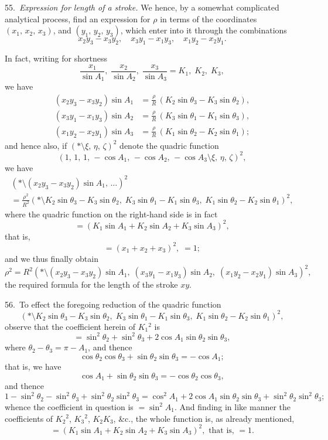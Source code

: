 \documentclass[12pt,a4paper]{article}
\theoremstyle{definition}
\begin{document}
55.\ \textit{Expression for length of a stroke.} We hence, by a somewhat complicated
analytical process, find an expression for $\rho$ in terms of the coordinates
$(x_1,\, x_2,\, x_3)$, and $(y_1,\, y_2,\, y_3)$, which enter into it through the combinations
\[
x_2 y_3 - x_3 y_2, \quad x_3 y_1 - x_1 y_3, \quad x_1 y_2 - x_2 y_1.
\]

In fact, writing for shortness
\[
\frac{x_1}{\sin A_1},\; \frac{x_2}{\sin A_2},\; \frac{x_3}{\sin A_3} = K_1,\; K_2,\; K_3,
\]
we have
\begin{align*}
(x_2 y_3 - x_3 y_2) \sin A_1 &= \frac{\rho}{R}\, (K_2 \sin \theta_3 - K_3 \sin \theta_2),\\
(x_3 y_1 - x_1 y_3) \sin A_2 &= \frac{\rho}{R}\, (K_3 \sin \theta_1 - K_1 \sin \theta_3),\\
(x_1 y_2 - x_2 y_1) \sin A_3 &= \frac{\rho}{R}\, (K_1 \sin \theta_2 - K_2 \sin \theta_1);
\end{align*}
and hence also, if $(*\!\mathbin{\!\!\setminus\!\!}\xi,\, \eta,\, \zeta)^2$ denote the quadric function
\[
(1,\, 1,\, 1,\, -\cos A_1,\, -\cos A_2,\, -\cos A_3 \!\mathbin{\!\!\setminus\!\!}\xi,\, \eta,\, \zeta)^2,
\]
we have
\begin{multline*}
(*\!\mathbin{\!\!\setminus\!\!}(x_2 y_3 - x_3 y_2) \sin A_1,\, \ldots)^2\\
= \frac{\rho^2}{R^2}
(*\!\mathbin{\!\!\setminus\!\!}K_2 \sin \theta_3 - K_3 \sin \theta_2,\;
K_3 \sin \theta_1 - K_1 \sin \theta_3,\;
K_1 \sin \theta_2 - K_2 \sin \theta_1)^2,
\end{multline*}
where the quadric function on the right-hand side is in fact
\[
= (K_1 \sin A_1 + K_2 \sin A_2 + K_3 \sin A_3)^2,
\]
that is,
\[
= (x_1 + x_2 + x_3)^2,\; = 1;
\]
and we thus finally obtain
\[
\rho^2 = R^2
(*\!\mathbin{\!\!\setminus\!\!}(x_2 y_3 - x_3 y_2) \sin A_1,\;
(x_3 y_1 - x_1 y_3) \sin A_2,\;
(x_1 y_2 - x_2 y_1) \sin A_3)^2,
\]
the required formula for the length of the stroke $xy$.

56.\ To effect the foregoing reduction of the quadric function
\[
(*\!\mathbin{\!\!\setminus\!\!}K_2 \sin \theta_3 - K_3 \sin \theta_2,\;
K_3 \sin \theta_1 - K_1 \sin \theta_3,\;
K_1 \sin \theta_2 - K_2 \sin \theta_1)^2,
\]
observe that the coefficient herein of $K_1{}^2$ is
\[
= \sin^2 \theta_2 + \sin^2 \theta_3 + 2 \cos A_1 \sin \theta_2 \sin \theta_3,
\]
where $\theta_2 - \theta_3 = \pi - A_1$, and thence
\[
\cos \theta_2 \cos \theta_3 + \sin \theta_2 \sin \theta_3 = -\cos A_1;
\]
that is, we have
\[
\cos A_1 + \sin \theta_2 \sin \theta_3 = -\cos \theta_2 \cos \theta_3,
\]
and thence
\[
1 - \sin^2 \theta_2 - \sin^2 \theta_3 + \sin^2 \theta_2 \sin^2 \theta_3
= \cos^2 A_1 + 2 \cos A_1 \sin \theta_2 \sin \theta_3 + \sin^2 \theta_2 \sin^2 \theta_3;
\]
whence the coefficient in question is $= \sin^2 A_1$.
And finding in like manner the coefficients of $K_2{}^2$, $K_3{}^2$, $K_2 K_3$, \&c.,
the whole function is, as already mentioned,
\[
= (K_1 \sin A_1 + K_2 \sin A_2 + K_3 \sin A_3)^2, \text{ that is, } = 1.
\]
\end{document}
